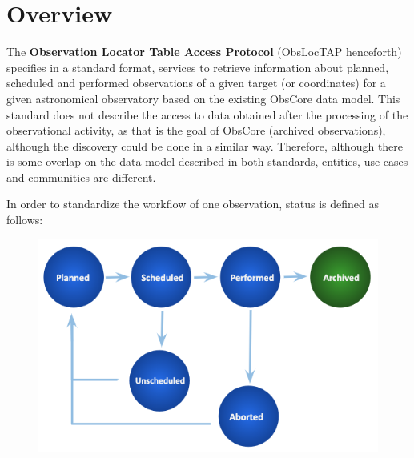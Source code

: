 \documentclass[11pt,a4paper]{ivoa}
\begin{document}
\section{Overview}
The \textbf{Observation Locator Table Access Protocol} (ObsLocTAP henceforth)
specifies in a standard format, services to retrieve information about planned,
scheduled and performed observations of a given target (or coordinates) for a
given astronomical observatory based on the existing ObsCore data model. This
standard does not describe the access to data obtained after the processing of
the observational activity, as that is the goal of ObsCore (archived
observations), although the discovery could be done in a similar way.
Therefore, although there is some overlap on the data model described in both
standards, entities, use cases and communities are different.

In order to standardize the workflow of one observation, status is defined as
follows:

\begin{figure}[H]
\advance\leftskip 0.0in		\hfill\includegraphics[width=5.0in]
{./media/observations_workflow.png}\hfill\strut%
\end{figure}
\end{document}

